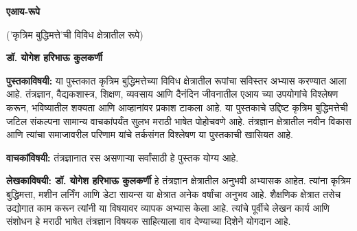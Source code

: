 \documentclass{article}
\begin{document}
\thispagestyle{empty}
\null\vfill

\begin{center}
{\fontsize{58}{78}\selectfont\color{titleorange}\textbf{एआय-रूपे}}

\vspace{1em}

{\fontsize{12}{14}\selectfont\color{subtitleblue}('कृत्रिम बुद्धिमत्ते'ची विविध क्षेत्रातील रूपे)}

\vspace{5em}

{\fontsize{16}{20}\selectfont\color{authorgreen}\textbf{डॉ. योगेश हरिभाऊ कुलकर्णी}}
\end{center}

\vfill\null
\clearpage

\thispagestyle{empty}
\vspace*{0.5in}

\noindent\textbf{पुस्तकाविषयी:} या पुस्तकात कृत्रिम बुद्धिमत्तेच्या विविध क्षेत्रातील रूपांचा सविस्तर अभ्यास करण्यात आला आहे. तंत्रज्ञान, वैद्यकशास्त्र, शिक्षण, व्यवसाय आणि दैनंदिन जीवनातील एआय च्या उपयोगांचे विश्लेषण करून, भविष्यातील शक्यता आणि आव्हानांवर प्रकाश टाकला आहे.  या पुस्तकाचे उद्दिष्ट कृत्रिम बुद्धिमत्तेची जटिल संकल्पना सामान्य वाचकांपर्यंत सुलभ मराठी भाषेत पोहोचवणे आहे. तंत्रज्ञान क्षेत्रातील नवीन विकास आणि त्यांचा समाजावरील परिणाम यांचे तर्कसंगत विश्लेषण या पुस्तकाची खासियत आहे.

\vspace{1.5em}

\noindent\textbf{वाचकांविषयी:} तंत्रज्ञानात रस असणाऱ्या सर्वांसाठी हे पुस्तक योग्य आहे.

\vspace{1.5em}

\noindent\textbf{लेखकाविषयी: डॉ. योगेश हरिभाऊ कुलकर्णी} हे तंत्रज्ञान क्षेत्रातील अनुभवी अभ्यासक आहेत. त्यांना कृत्रिम बुद्धिमत्ता, मशीन लर्निंग आणि डेटा सायन्स या क्षेत्रात अनेक वर्षांचा अनुभव आहे. शैक्षणिक क्षेत्रात तसेच उद्योगात काम करून त्यांनी या विषयावर व्यापक अभ्यास केला आहे. त्यांचे पूर्वीचे लेखन कार्य आणि संशोधन हे मराठी भाषेत तंत्रज्ञान विषयक साहित्याला वाव देण्याच्या दिशेने योगदान आहे.

\vfill
\end{document}
